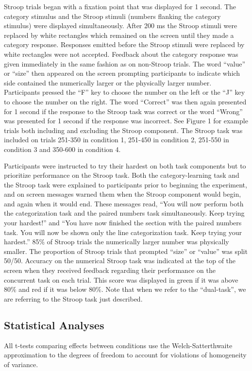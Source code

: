 \documentclass[apacite,draftfirst,man]{apa6}
\begin{document}
Stroop trials began with a fixation point that was displayed for 1 second. The
category stimulus and the Stroop stimuli (numbers flanking the category
stimulus) were displayed simultaneously. After 200 ms the Stroop stimuli were
replaced by white rectangles which remained on the screen until they made a
category response. Responses emitted before the Stroop stimuli were replaced by
white rectangles were not accepted. Feedback about the category response was
given immediately in the same fashion as on non-Stroop trials. The word
``value'' or ``size'' then appeared on the screen prompting participants to
indicate which side contained the numerically larger or the physically larger
number. Participants pressed the ``F'' key to choose the number on the left or
the ``J'' key to choose the number on the right. The word ``Correct'' was then
again presented for 1 second if the response to the Stroop task was correct or
the word ``Wrong'' was presented for 1 second if the response was incorrect. See
Figure 1 for example trials both including and excluding the Stroop component.
The Stroop task was included on trials 251-350 in condition 1, 251-450 in
condition 2, 251-550 in condition 3 and 350-600 in condition 4.

Participants were instructed to try their hardest on both task components but to
prioritize performance on the Stroop task. Both the category-learning task and
the Stroop task were explained to participants prior to beginning the
experiment, and on screen messages warned them when the Stroop component would
begin, and again when it would end. These messages read, ``You will now perform
both the categorization task and the paired numbers task simultaneously. Keep
trying your hardest!'' and ``You have now finished the section with the paired
numbers task. You will now be shown only the line categorization task. Keep
trying your hardest.'' 85\% of Stroop trials the numerically larger number was
physically smaller. The proportion of Stroop trials that prompted ``size'' or
``value'' was split 50/50. Accuracy on the numerical Stroop task was indicated
at the top of the screen when they received feedback regarding their performance
on the concurrent task on each trial. This score was displayed in green if it
was above 80\% and red if it was below 80\%. Note that when we refer to the
``dual-task'', we are referring to the Stroop task just described.

\subsection*{Statistical Analyses}
All t-tests comparing effects between conditions use the Welch-Satterthwaite
approximation to the degrees of freedom to account for violations of homogeneity
of variance.
\end{document}

